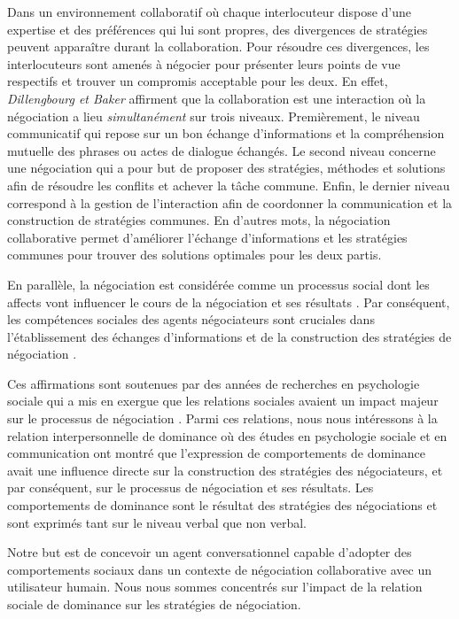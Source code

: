 Dans un environnement collaboratif où chaque interlocuteur dispose d'une expertise et des préférences qui lui sont propres, des divergences de stratégies peuvent apparaître durant la collaboration. 
Pour résoudre ces divergences, les interlocuteurs sont amenés à négocier pour présenter leurs points de vue respectifs et trouver un compromis acceptable pour les deux.  
En effet, \emph{Dillengbourg et Baker} \cite{dillenbourg1996negotiation} affirment que la collaboration est une interaction où la négociation a lieu \textit{simultanément} sur trois niveaux. Premièrement, le niveau communicatif qui repose sur un bon échange d'informations et la compréhension mutuelle des phrases ou actes de dialogue échangés. Le second niveau concerne une négociation qui a pour but de proposer des stratégies, méthodes et solutions afin de résoudre les conflits et achever la tâche commune. Enfin, le dernier niveau correspond à la gestion de l'interaction afin de coordonner la communication et la construction de stratégies communes. En d'autres mots, la négociation collaborative permet d'améliorer l'échange d'informations et les stratégies communes pour trouver des solutions optimales pour les deux partis. 

En parallèle, la négociation est  considérée comme un processus social dont les affects vont influencer le cours de la négociation et ses résultats \cite{broekens2010affective}. Par conséquent, les compétences sociales des agents négociateurs sont cruciales dans l'établissement des échanges d'informations et de la construction des stratégies de négociation \cite{jin2010study}. 

Ces affirmations sont soutenues par des années de recherches en psychologie sociale qui a mis en exergue que les relations sociales avaient un impact majeur sur le processus de négociation \cite{thompson2010negotiation}. Parmi ces relations, nous nous intéressons à la relation interpersonnelle de dominance où des études en psychologie sociale et en communication ont montré que l'expression de comportements de dominance avait une influence directe sur la construction des stratégies des négociateurs, et par conséquent, sur le processus de négociation et ses résultats.
Les comportements de dominance sont le résultat des stratégies des négociations et sont exprimés tant sur le niveau verbal que non verbal.

Notre but est de concevoir un agent conversationnel capable d'adopter des comportements sociaux dans un contexte de négociation collaborative avec un utilisateur humain. Nous nous sommes concentrés sur l'impact de la relation sociale de dominance sur les stratégies de négociation.

